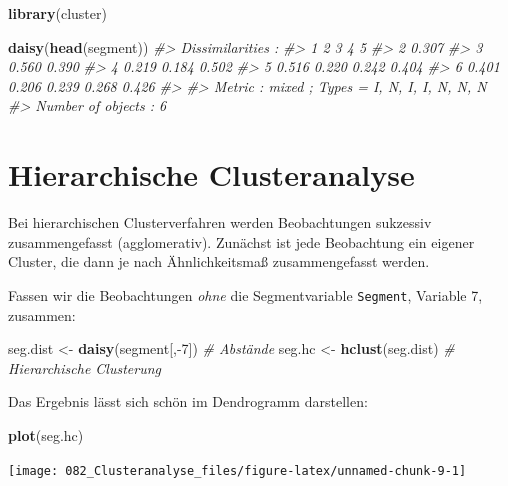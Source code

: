 \documentclass[12pt,]{book}
\newenvironment{Shaded}{\begin{snugshade}}{\end{snugshade}}
\newcommand{\KeywordTok}[1]{\textcolor[rgb]{0.13,0.29,0.53}{\textbf{{#1}}}}
\newcommand{\DecValTok}[1]{\textcolor[rgb]{0.00,0.00,0.81}{{#1}}}
\newcommand{\StringTok}[1]{\textcolor[rgb]{0.31,0.60,0.02}{{#1}}}
\newcommand{\CommentTok}[1]{\textcolor[rgb]{0.56,0.35,0.01}{\textit{{#1}}}}
\newcommand{\NormalTok}[1]{{#1}}
\begin{document}
\begin{Shaded}
\begin{Highlighting}[]
\KeywordTok{library}\NormalTok{(cluster)}

\KeywordTok{daisy}\NormalTok{(}\KeywordTok{head}\NormalTok{(segment))}
\CommentTok{#> Dissimilarities :}
\CommentTok{#>       1     2     3     4     5}
\CommentTok{#> 2 0.307                        }
\CommentTok{#> 3 0.560 0.390                  }
\CommentTok{#> 4 0.219 0.184 0.502            }
\CommentTok{#> 5 0.516 0.220 0.242 0.404      }
\CommentTok{#> 6 0.401 0.206 0.239 0.268 0.426}
\CommentTok{#> }
\CommentTok{#> Metric :  mixed ;  Types = I, N, I, I, N, N, N }
\CommentTok{#> Number of objects : 6}
\end{Highlighting}
\end{Shaded}

\section{Hierarchische
Clusteranalyse}\label{hierarchische-clusteranalyse}

Bei hierarchischen Clusterverfahren werden Beobachtungen sukzessiv
zusammengefasst (agglomerativ). Zunächst ist jede Beobachtung ein
eigener Cluster, die dann je nach Ähnlichkeitsmaß zusammengefasst
werden.

Fassen wir die Beobachtungen \emph{ohne} die Segmentvariable
\texttt{Segment}, Variable 7, zusammen:

\begin{Shaded}
\begin{Highlighting}[]
\NormalTok{seg.dist <-}\StringTok{ }\KeywordTok{daisy}\NormalTok{(segment[,-}\DecValTok{7}\NormalTok{]) }\CommentTok{# Abstände}
\NormalTok{seg.hc <-}\StringTok{ }\KeywordTok{hclust}\NormalTok{(seg.dist) }\CommentTok{# Hierarchische Clusterung}
\end{Highlighting}
\end{Shaded}

Das Ergebnis lässt sich schön im Dendrogramm darstellen:

\begin{Shaded}
\begin{Highlighting}[]
\KeywordTok{plot}\NormalTok{(seg.hc)}
\end{Highlighting}
\end{Shaded}

\begin{center}\texttt{[image: 082\_Clusteranalyse\_files/figure-latex/unnamed-chunk-9-1]} \end{center}
\end{document}
